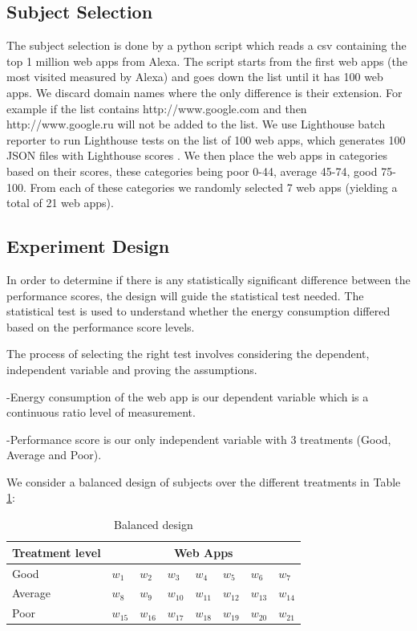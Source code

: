 \subsection{Subject Selection}
	
	The subject selection is done by a python script \cite{WEBSITE:11} which reads a csv containing the top 1 million web apps from Alexa. The script starts from the first web apps (the most visited measured by Alexa) and goes down the list until it has 100 web apps. We discard domain names where the only difference is their extension. For example if the list contains http://www.google.com and then http://www.google.ru will not be added to the list.
We use Lighthouse batch reporter to run Lighthouse tests on the list of 100 web apps, which generates 100 JSON files with Lighthouse scores \cite{WEBSITE:12}. 
We then place the web apps in categories based on their scores, these categories being poor 0-44, average 45-74, good 75-100. From each of these categories we randomly selected 7 web apps (yielding a total of 21 web apps). \newline
	
\subsection{Experiment Design}


In order to determine if there is any statistically significant
difference between the performance scores, the design will guide the statistical test needed. The statistical test is used to understand whether the energy consumption differed based on the performance score levels.

The process of selecting the right test involves considering the dependent, independent variable and proving the assumptions. 

-Energy consumption of the web app is our dependent variable which is a continuous ratio level of measurement.

-Performance score is our only independent variable with 3 treatments (Good, Average and Poor). \newline

We consider a balanced design of subjects over the different treatments in Table \ref{tab:design}: 


\begin{table}[h!]
\begin{tabular}{|l|l|l|l|l|l|l|l|}\hline
\textbf{Treatment level} &  \multicolumn{7}{|c|}{\textbf{Web Apps}} \\\hline
  Good & $w_1$ & $w_2$ & $w_3$ & $w_4$ & $w_5$ & $w_6$ & $w_7$ \\\hline
  Average & $w_8$ & $w_9$ & $w_{10}$ & $w_{11}$ & $w_{12}$ & $w_{13}$ & $w_{14}$ \\\hline
  Poor & $w_{15}$ & $w_{16}$ & $w_{17}$ & $w_{18}$ & $w_{19}$ & $w_{20}$ & $w_{21}$ \\\hline
    \end{tabular}
       \caption{Balanced design}
    \label{tab:design}
\end{table}

